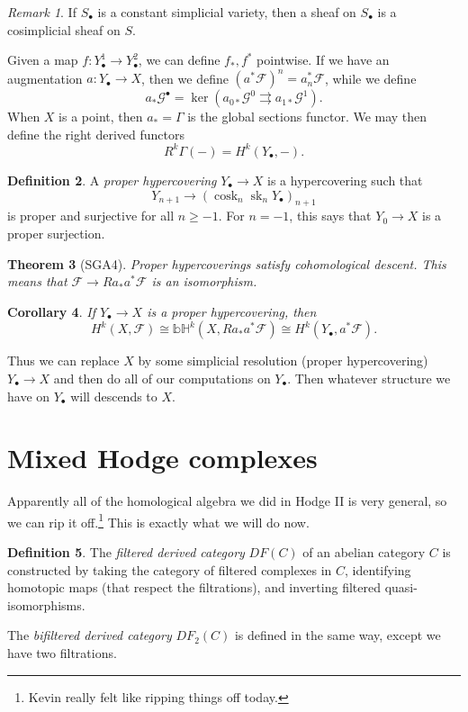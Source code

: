 \documentclass[leqno, openany]{memoir}
\newtheorem{thm}{Theorem}[section]
\newtheorem{cor}[thm]{Corollary}
\theoremstyle{definition}
\newtheorem{defn}[thm]{Definition}
\theoremstyle{remark}
\newtheorem{rmk}[thm]{Remark}
\theoremstyle{plain}
\theoremstyle{definition}
\theoremstyle{remark}
\newcommand{\bH}{\mathbb{bH}}
\newcommand{\mc}[1]{\mathcal{#1}}
\newcommand{\on}[1]{\operatorname{#1}}
\begin{document}
\begin{rmk}
    If $S_{\bullet}$ is a constant simplicial variety, then a sheaf on $S_{\bullet}$ is a cosimplicial sheaf on $S$.
\end{rmk}

Given a map $f \colon Y_{\bullet}^1 \to Y_{\bullet}^2$, we can define $f_*, f^*$ pointwise. If we have an augmentation $a \colon Y_{\bullet} \to X$, then we define $(a^* \mc{F})^n = a_n^* \mc{F}$, while we define
\[ a_* \mc{G}^{\bullet} = \ker (a_{0*} \mc{G}^0 \rightrightarrows a_{1*} \mc{G}^1). \]
When $X$ is a point, then $a_* = \Gamma$ is the global sections functor. We may then define the right derived functors
\[ R^k \Gamma(-) = H^k(Y_{\bullet}, -). \]

\begin{defn}
    A \textit{proper hypercovering} $Y_{\bullet} \to X$ is a hypercovering such that
    \[ Y_{n+1} \to (\on{cosk}_n \on{sk}_n Y_{\bullet})_{n+1} \]
    is proper and surjective for all $n \geq -1$. For $n = -1$, this says that $Y_0 \to X$ is a proper surjection.
\end{defn}

\begin{thm}[SGA4]
    Proper hypercoverings satisfy cohomological descent. This means that $\mc{F} \to R a_* a^* \mc{F}$ is an isomorphism.
\end{thm}

\begin{cor}
    If $Y_{\bullet} \to X$ is a proper hypercovering, then
    \[ H^k(X, \mc{F}) \cong \bH^k(X, Ra_* a^* \mc{F}) \cong H^k(Y_{\bullet}, a^* \mc{F}). \]
\end{cor}

Thus we can replace $X$ by some simplicial resolution (proper hypercovering) $Y_{\bullet} \to X$ and then do all of our computations on $Y_{\bullet}$. Then whatever structure we have on $Y_{\bullet}$ will descends to $X$.

\section{Mixed Hodge complexes}%
\label{sec:mixed_hodge_complexes}

Apparently all of the homological algebra we did in Hodge II is very general, so we can rip it off.\footnote{Kevin really felt like ripping things off today.} This is exactly what we will do now.

\begin{defn}
    The \textit{filtered derived category} $DF(C)$ of an abelian category $C$ is constructed by taking the category of filtered complexes in $C$, identifying homotopic maps (that respect the filtrations), and inverting filtered quasi-isomorphisms.

    The \textit{bifiltered derived category} $DF_2(C)$ is defined in the same way, except we have two filtrations.
\end{defn}
\end{document}
